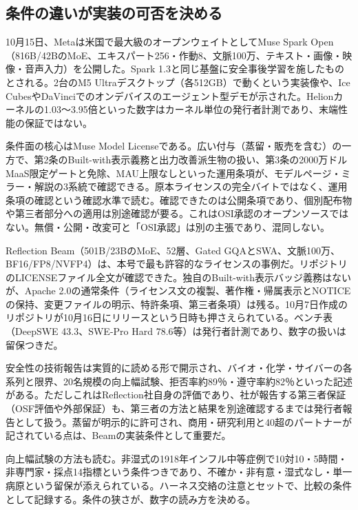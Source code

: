 \documentclass[lualatex,a4paper,10pt]{jlreq}
\begin{document}
\subsection*{条件の違いが実装の可否を決める}

10月15日、Metaは米国で最大級のオープンウェイトとしてMuse Spark Open（816B/42BのMoE、エキスパート256・作動8、文脈100万、テキスト・画像・映像・音声入力）を公開した。Spark 1.3と同じ基盤に安全事後学習を施したものとされる。2台のM5 Ultraデスクトップ（各512GB）で動くという実装像や、Ice CubesやDaVinciでのオンデバイスのエージェント型デモが示された。Helionカーネルの1.03〜3.95倍といった数字はカーネル単位の発行者計測であり、末端性能の保証ではない。
\cite{B14,B70,B15,B13,B71}


条件面の核心はMuse Model Licenseである。広い付与（蒸留・販売を含む）の一方で、第2条のBuilt-with表示義務と出力改善派生物の扱い、第3条の2000万ドルMaaS限定ゲートと免除、MAU上限なしといった運用条項が、モデルページ・ミラー・解説の3系統で確認できる。原本ライセンスの完全バイトではなく、運用条項の確認という確認水準で読む。確認できたのは公開条項であり、個別配布物や第三者部分への適用は別途確認が要る。これはOSI承認のオープンソースではない。無償・公開・改変可と「OSI承認」は別の主張であり、混同しない。
\cite{B14,B70,B15,B13,B71}


Reflection Beam（501B/23BのMoE、52層、Gated GQAとSWA、文脈100万、BF16/FP8/NVFP4）は、本号で最も許容的なライセンスの事例だ。リポジトリのLICENSEファイル全文が確認できた。独自のBuilt-with表示バッジ義務はないが、Apache 2.0の通常条件（ライセンス文の複製、著作権・帰属表示とNOTICEの保持、変更ファイルの明示、特許条項、第三者条項）は残る。10月7日作成のリポジトリが10月16日にリリースという日時も押さえられている。ベンチ表（DeepSWE 43.3、SWE-Pro Hard 78.6等）は発行者計測であり、数字の扱いは留保つきだ。
\cite{B17,B19,B18,B16}


安全性の技術報告は実質的に読める形で開示され、バイオ・化学・サイバーの各系列と限界、20名規模の向上幅試験、拒否率約89％・遵守率約82％といった記述がある。ただしこれはReflection社自身の評価であり、社が報告する第三者保証（OSF評価や外部保証）も、第三者の方法と結果を別途確認するまでは発行者報告として扱う。蒸留が明示的に許可され、商用・研究利用と40超のパートナーが記されている点は、Beamの実装条件として重要だ。
\cite{B17,B19,B18,B16}


向上幅試験の方法も読む。非湿式の1918年インフル中等症例で10対10・5時間・非専門家・採点14指標という条件つきであり、不確か・非有意・湿式なし・単一病原という留保が添えられている。ハーネス交絡の注意とセットで、比較の条件として記録する。条件の狭さが、数字の読み方を決める。
\cite{B17,B19,B18,B16}
\end{document}
